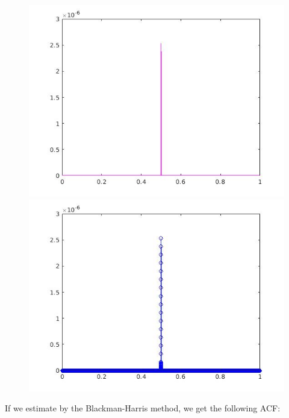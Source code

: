 \documentclass[a4paper,11pt]{article}
\begin{document}
\begin{figure}[!hp]
\centering
\begin{minipage}{.5\textwidth}
  \centering
  \includegraphics[width=1\linewidth]{images/lab2_50.jpg}
\end{minipage}%
\begin{minipage}{.5\textwidth}
  \centering
  \includegraphics[width=1\linewidth]{images/lab2_51.jpg}
\end{minipage}
\end{figure}

\newpage

If we estimate by the Blackman-Harris method, we get the following ACF:
\end{document}
